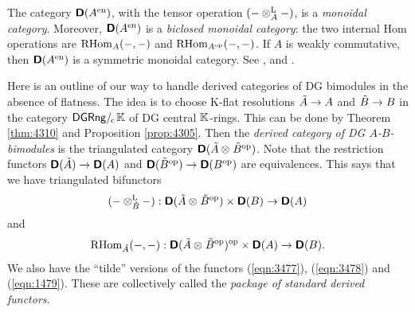 \begin{rem} \label{rem:3450}
The category $\boldsymbol{\mathsf{D}}(A^{\mathrm{en}})$, with the tensor operation 
$(- \otimes^{\mathrm{L}}_{A} -)$, is a {\em monoidal category}.
Moreover, $\boldsymbol{\mathsf{D}}(A^{\mathrm{en}})$ is a {\em biclosed monoidal category}: the 
two internal Hom operations are 
$\operatorname{RHom}_A(-, -)$ and $\operatorname{RHom}_{A^{\mathrm{op}}}(-, -)$.
If $A$ is weakly commutative, then $\boldsymbol{\mathsf{D}}(A^{\mathrm{en}})$ is a symmetric 
monoidal category. See \cite[Section 5]{VyYe}, \cite{Mac2} and \cite{nLab}. 
\end{rem}

\begin{rem} \label{rem:1420}
Here is an outline of our way to handle derived categories of DG bimodules in 
the absence of flatness. The idea is to choose K-flat resolutions 
$\tilde{A} \to A$ and $\tilde{B} \to B$ in the category 
$\mathrm{\mathsf{DGRng}} /_{\mspace{-2mu} \mathrm{c}} \mspace{2mu} \mathbb{K}$
of DG central $\mathbb{K}$-rings. This can be done by 
Theorem \ref{thm:4310} and Proposition \ref{prop:4305}. 
Then the {\em derived category of DG $A$-$B$-bimodules} 
is the triangulated 
category $\boldsymbol{\mathsf{D}}(\tilde{A} \otimes_{} \tilde{B}^{\mathrm{op}})$.
Note that the restriction functors 
$\boldsymbol{\mathsf{D}}(\tilde{A}) \to \boldsymbol{\mathsf{D}}(A)$ and 
$\boldsymbol{\mathsf{D}}(\tilde{B}^{\mathrm{op}}) \to \boldsymbol{\mathsf{D}}(B^{\mathrm{op}})$ 
are equivalences. This says that we have triangulated bifunctors 
\[ (- \otimes^{\mathrm{L}}_{\tilde{B}} -) : 
\boldsymbol{\mathsf{D}}(\tilde{A} \otimes_{} \tilde{B}^{\mathrm{op}}) \times 
\boldsymbol{\mathsf{D}}(B) \to \boldsymbol{\mathsf{D}}(A) \]
and
\[ \operatorname{RHom}_{\tilde{A}}(-, -) : 
\boldsymbol{\mathsf{D}}(\tilde{A} \otimes_{} \tilde{B}^{\mathrm{op}})^{\mathrm{op}} \times 
\boldsymbol{\mathsf{D}}(A) \to \boldsymbol{\mathsf{D}}(B) . \]
We also have the ``tilde'' versions of the functors 
(\ref {eqn:3477}), (\ref{eqn:3478}) and (\ref{eqn:1479}). 
These are collectively called the {\em package of standard derived functors}. 


\end{rem}
